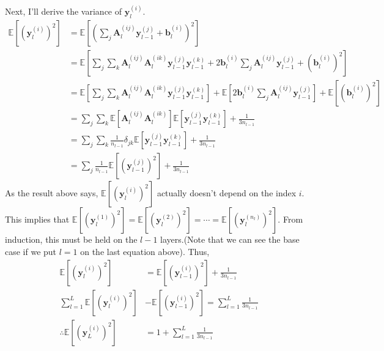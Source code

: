 \documentclass[10pt]{article}
\begin{document}
Next, I'll derive the variance of $\mathbf{y}^{(i)}_l$.
\begin{align*}
    \mathbb{E}\left[\left(\mathbf{y}_l^{(i)}\right)^2\right] &= \mathbb{E}\left[\left(\sum_{j}\mathbf{A}_l^{(ij)}\mathbf{y}_{l-1}^{(j)} + \mathbf{b}_l^{(i)}\right)^2\right]\\
    &= \mathbb{E}\left[\sum_j\sum_k \mathbf{A}_l^{(ij)}\mathbf{A}_l^{(ik)}\mathbf{y}_{l-1}^{(j)}\mathbf{y}_{l-1}^{(k)} + 2\mathbf{b}_l^{(i)}\sum_j \mathbf{A}_l^{(ij)}\mathbf{y}_{l-1}^{(j)} + \left(\mathbf{b}_l^{(i)}\right)^2\right] \\
    &= \mathbb{E}\left[\sum_j\sum_k \mathbf{A}_l^{(ij)}\mathbf{A}_l^{(ik)}\mathbf{y}_{l-1}^{(j)}\mathbf{y}_{l-1}^{(k)}\right] + \mathbb{E}\left[2\mathbf{b}_l^{(i)}\sum_j \mathbf{A}_l^{(ij)}\mathbf{y}_{l-1}^{(j)}\right] + \mathbb{E}\left[\left(\mathbf{b}_l^{(i)}\right)^2\right]\\
    &= \sum_j\sum_k \mathbb{E}\left[\mathbf{A}_l^{(ij)}\mathbf{A}_l^{(ik)}\right]\mathbb{E}\left[\mathbf{y}_{l-1}^{(j)}\mathbf{y}_{l-1}^{(k)}\right] + \frac{1}{3n_{l-1}} \\
    &= \sum_j\sum_k \frac{1}{n_{l-1}}\delta_{jk}\mathbb{E}\left[\mathbf{y}_{l-1}^{(j)}\mathbf{y}_{l-1}^{(k)}\right] + \frac{1}{3n_{l-1}} \\
    &= \sum_j \frac{1}{n_{l-1}}\mathbb{E}\left[\left(\mathbf{y}_{l-1}^{(j)}\right)^2\right] + \frac{1}{3n_{l-1}}
\end{align*}
As the result above says, $\mathbb{E}\left[\left(\mathbf{y}_l^{(i)}\right)^2\right]$ actually doesn't depend on the index $i$. This implies that $\mathbb{E}\left[\left(\mathbf{y}_l^{(1)}\right)^2\right] = \mathbb{E}\left[\left(\mathbf{y}_l^{(2)}\right)^2\right] = \cdots = \mathbb{E}\left[\left(\mathbf{y}_l^{(n_l)}\right)^2\right]$.
From induction, this must be held on the $l-1$ layers.(Note that we can see the base case if we put $l=1$ on the last equation above). Thus, 
\begin{align*}
    \mathbb{E}\left[\left(\mathbf{y}_l^{(i)}\right)^2\right] &= \mathbb{E}\left[\left(\mathbf{y}_{l-1}^{(i)}\right)^2\right] + \frac{1}{3n_{l-1}} \\
    \sum_{l=1}^{L}\mathbb{E}\left[\left(\mathbf{y}_l^{(i)}\right)^2\right] &- \mathbb{E}\left[\left(\mathbf{y}_{l-1}^{(i)}\right)^2\right] = \sum_{l=1}^{L}\frac{1}{3n_{l-1}}\\
    \therefore \mathbb{E}\left[\left(\mathbf{y}_L^{(i)}\right)^2\right] &= 1 + \sum_{l=1}^{L}\frac{1}{3n_{l-1}}
\end{align*}
\end{document}
